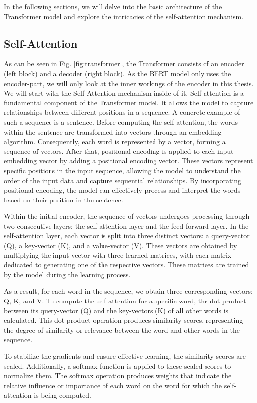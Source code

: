 \documentclass[a4paper,12pt]{report} %
\begin{document}
In the following sections, we will delve into the basic architecture of the Transformer model and explore the intricacies of the self-attention mechanism.

\subsection{Self-Attention}
As can be seen in Fig. \ref{fig:transformer}, the Transformer consists of an encoder (left block) and a decoder (right block). As the BERT model only uses the encoder-part, we will only look at the inner workings of the encoder in this thesis. We will start with the Self-Attention mechanism inside of it.
Self-attention is a fundamental component of the Transformer model. It allows the model to capture relationships between different positions in a sequence. A concrete example of such a sequence is a sentence. Before computing the self-attention, the words within the sentence are transformed into vectors through an embedding algorithm. Consequently, each word is represented by a vector, forming a sequence of vectors. After that, positional encoding is applied to each input embedding vector by adding a positional encoding vector. These vectors represent specific positions in the input sequence, allowing the model to understand the order of the input data and capture sequential relationships. By incorporating positional encoding, the model can effectively process and interpret the words based on their position in the sentence.

Within the initial encoder, the sequence of vectors undergoes processing through two consecutive layers: the self-attention layer and the feed-forward layer. In the self-attention layer, each vector is split into three distinct vectors: a query-vector (Q), a key-vector (K), and a value-vector (V). These vectors are obtained by multiplying the input vector with three learned matrices, with each matrix dedicated to generating one of the respective vectors. These matrices are trained by the model during the learning process.

As a result, for each word in the sequence, we obtain three corresponding vectors: Q, K, and V. To compute the self-attention for a specific word, the dot product between its query-vector (Q) and the key-vectors (K) of all other words is calculated. This dot product operation produces similarity scores, representing the degree of similarity or relevance between the word and other words in the sequence.

To stabilize the gradients and ensure effective learning, the similarity scores are scaled. Additionally, a softmax function is applied to these scaled scores to normalize them. The softmax operation produces weights that indicate the relative influence or importance of each word on the word for which the self-attention is being computed.
\end{document}
